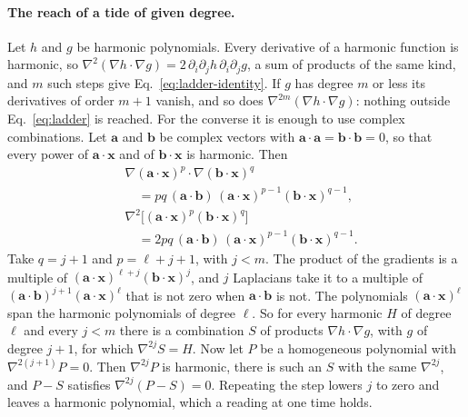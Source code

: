 \paragraph{The reach of a tide of given degree.} Let $h$ and $g$ be harmonic
polynomials. Every derivative of a harmonic function is harmonic, so
$\nabla^2(\nabla h\cdot\nabla g) = 2\,\partial_i\partial_jh\,\partial_i\partial_jg$,
a sum of products of the same kind, and $m$ such steps give
Eq.~\eqref{eq:ladder-identity}. If $g$ has degree $m$ or less its derivatives
of order $m + 1$ vanish, and so does $\nabla^{2m}(\nabla h\cdot\nabla g)$:
nothing outside Eq.~\eqref{eq:ladder} is reached. For the converse it is
enough to use complex combinations. Let $\mathbf a$ and $\mathbf b$ be complex
vectors with $\mathbf a\cdot\mathbf a = \mathbf b\cdot\mathbf b = 0$, so that
every power of $\mathbf a\cdot\mathbf x$ and of $\mathbf b\cdot\mathbf x$ is
harmonic. Then
\begin{equation}\label{eq:proof-ladder}
\begin{aligned}
&\nabla(\mathbf a\cdot\mathbf x)^p\cdot\nabla(\mathbf b\cdot\mathbf x)^q\\
&\quad= pq\,(\mathbf a\cdot\mathbf b)\,(\mathbf a\cdot\mathbf x)^{p-1}(\mathbf b\cdot\mathbf x)^{q-1},\\
&\nabla^2\bigl[(\mathbf a\cdot\mathbf x)^p(\mathbf b\cdot\mathbf x)^q\bigr]\\
&\quad= 2pq\,(\mathbf a\cdot\mathbf b)\,(\mathbf a\cdot\mathbf x)^{p-1}(\mathbf b\cdot\mathbf x)^{q-1}.
\end{aligned}
\end{equation}
Take $q = j + 1$ and $p = \ell + j + 1$, with $j < m$. The product of the
gradients is a multiple of
$(\mathbf a\cdot\mathbf x)^{\ell+j}(\mathbf b\cdot\mathbf x)^{j}$, and $j$
Laplacians take it to a multiple of
$(\mathbf a\cdot\mathbf b)^{j+1}(\mathbf a\cdot\mathbf x)^\ell$ that is not zero
when $\mathbf a\cdot\mathbf b$ is not. The polynomials
$(\mathbf a\cdot\mathbf x)^\ell$ span the harmonic polynomials of degree $\ell$. So
for every harmonic $H$ of degree $\ell$ and every $j < m$ there is a combination
$S$ of products $\nabla h\cdot\nabla g$, with $g$ of degree $j + 1$, for which
$\nabla^{2j}S = H$. Now let $P$ be a homogeneous polynomial with
$\nabla^{2(j+1)}P = 0$. Then $\nabla^{2j}P$ is harmonic, there is such an $S$
with the same $\nabla^{2j}$, and $P - S$ satisfies $\nabla^{2j}(P - S) = 0$.
Repeating the step lowers $j$ to zero and leaves a harmonic polynomial, which
a reading at one time holds.

